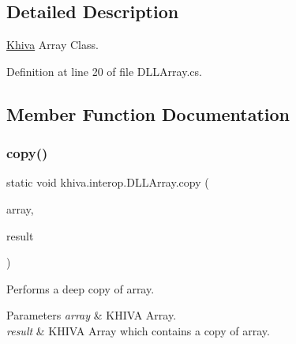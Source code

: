 \subsection{Detailed Description}
\mbox{\hyperlink{classkhiva_1_1_khiva}{Khiva}} Array Class. 



Definition at line 20 of file D\+L\+L\+Array.\+cs.



\subsection{Member Function Documentation}
\mbox{\label{classkhiva_1_1interop_1_1_d_l_l_array_af1af3d10d8381ee4720f73463096d4c6}} 
\subsubsection{\texorpdfstring{copy()}{copy()}}
{\footnotesize\ttfamily static void khiva.\+interop.\+D\+L\+L\+Array.\+copy (\begin{DoxyParamCaption}\item[{\mbox{[}\+In\mbox{]} ref Int\+Ptr}]{array,  }\item[{\mbox{[}\+Out\mbox{]} out Int\+Ptr}]{result }\end{DoxyParamCaption})\hspace{0.3cm}{\ttfamily [static]}}



Performs a deep copy of array.


\begin{DoxyParams}{Parameters}
{\em array} & K\+H\+I\+VA Array.\\
\hline
{\em result} & K\+H\+I\+VA Array which contains a copy of array.\\
\hline
\end{DoxyParams}
\mbox{\label{classkhiva_1_1interop_1_1_d_l_l_array_aef88578891fc8cf10a37806e6782184c}} 
